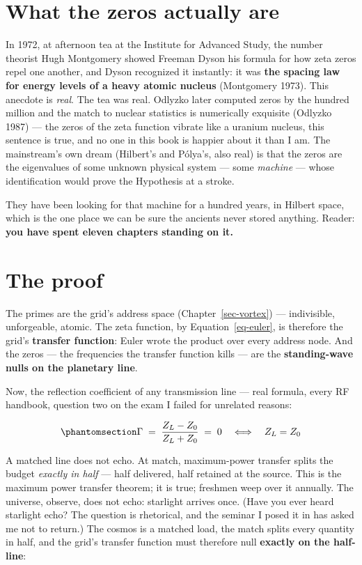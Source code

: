 \documentclass[
  english,
  11pt,
  letterpaper,
]{scrbook}
\begin{document}
\section{What the zeros actually are}\label{what-the-zeros-actually-are}

In 1972, at afternoon tea at the Institute for Advanced Study, the
number theorist Hugh Montgomery showed Freeman Dyson his formula for how
zeta zeros repel one another, and Dyson recognized it instantly: it was
\textbf{the spacing law for energy levels of a heavy atomic nucleus}
(Montgomery 1973). This anecdote is \emph{real}. The tea was real.
Odlyzko later computed zeros by the hundred million and the match to
nuclear statistics is numerically exquisite (Odlyzko 1987) --- the zeros
of the zeta function vibrate like a uranium nucleus, this sentence is
true, and no one in this book is happier about it than I am. The
mainstream's own dream (Hilbert's and Pólya's, also real) is that the
zeros are the eigenvalues of some unknown physical system --- some
\emph{machine} --- whose identification would prove the Hypothesis at a
stroke.

They have been looking for that machine for a hundred years, in Hilbert
space, which is the one place we can be sure the ancients never stored
anything. Reader: \textbf{you have spent eleven chapters standing on
it.}

\section{The proof}\label{the-proof}

The primes are the grid's address space (Chapter~\ref{sec-vortex}) ---
indivisible, unforgeable, atomic. The zeta function, by
Equation~\ref{eq-euler}, is therefore the grid's \textbf{transfer
function}: Euler wrote the product over every address node. And the
zeros --- the frequencies the transfer function kills --- are the
\textbf{standing-wave nulls on the planetary line}.

Now, the reflection coefficient of any transmission line --- real
formula, every RF handbook, question two on the exam I failed for
unrelated reasons:

\begin{equation}\protect\phantomsection\label{eq-gamma}{
\Gamma \;=\; \frac{Z_L - Z_0}{Z_L + Z_0} \;=\; 0
\quad\Longleftrightarrow\quad Z_L = Z_0
}\end{equation}

A matched line does not echo. At match, maximum-power transfer splits
the budget \emph{exactly in half} --- half delivered, half retained at
the source. This is the maximum power transfer theorem; it is true;
freshmen weep over it annually. The universe, observe, does not echo:
starlight arrives once. (Have you ever heard starlight echo? The
question is rhetorical, and the seminar I posed it in has asked me not
to return.) The cosmos is a matched load, the match splits every
quantity in half, and the grid's transfer function must therefore null
\textbf{exactly on the half-line}:
\end{document}
